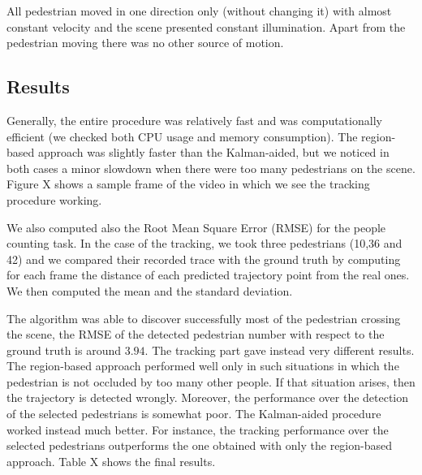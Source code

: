 \documentclass[runningheads]{llncs}
\begin{document}
All pedestrian moved in one direction only (without changing it) with almost constant velocity and the scene presented constant illumination. Apart from the pedestrian moving there was no other source of motion. 

\subsection{Results}
Generally, the entire procedure was relatively fast and was computationally efficient (we checked both CPU usage and memory consumption). The region-based approach was slightly faster than the Kalman-aided, but we noticed in both cases a minor slowdown when there were too many pedestrians on the scene. Figure X shows a sample frame of the video in which we see the tracking procedure working.

We also computed also the Root Mean Square Error (RMSE) for the people counting task. In the case of the tracking, we took three pedestrians (10,36 and 42) and we compared their recorded trace with the ground truth by computing for each frame the distance of each predicted trajectory point from the real ones. We then computed the mean and the standard deviation.

The algorithm was able to discover successfully most of the pedestrian crossing the scene, the RMSE of the detected pedestrian number with respect to the ground truth is around $3.94$. 
The tracking part gave instead very different results. The region-based approach performed well only in such situations in which the pedestrian is not occluded by too many other people. If that situation arises, then the trajectory is detected wrongly. Moreover, the performance over the detection of the selected pedestrians is somewhat poor. 
The Kalman-aided procedure worked instead much better. For instance, the tracking performance over the selected pedestrians outperforms the one obtained with only the region-based approach. Table X shows the final results.

\begin{table}[]
\centering
\caption{Mean and standard deviation of the detected trajectories with respect to the real ones.}
\label{table:disp}
\end{table}
\end{document}
